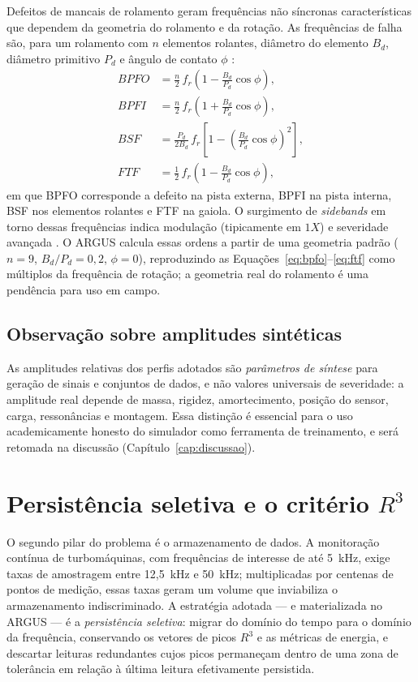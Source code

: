 Defeitos de mancais de rolamento geram frequências não síncronas características
que dependem da geometria do rolamento e da rotação. As frequências de falha
são, para um rolamento com \(n\) elementos rolantes, diâmetro do elemento
\(B_d\), diâmetro primitivo \(P_d\) e ângulo de contato \(\phi\)
\cite{randall2011,harris2002}:
\begin{align}
\label{eq:bpfo}
  BPFO &= \frac{n}{2}\, f_r \left(1 - \frac{B_d}{P_d}\cos\phi\right),\\[2pt]
\label{eq:bpfi}
  BPFI &= \frac{n}{2}\, f_r \left(1 + \frac{B_d}{P_d}\cos\phi\right),\\[2pt]
\label{eq:bsf}
  BSF  &= \frac{P_d}{2 B_d}\, f_r \left[1 - \left(\frac{B_d}{P_d}\cos\phi\right)^2\right],\\[2pt]
\label{eq:ftf}
  FTF  &= \frac{1}{2}\, f_r \left(1 - \frac{B_d}{P_d}\cos\phi\right),
\end{align}
em que BPFO corresponde a defeito na pista externa, BPFI na pista interna, BSF
nos elementos rolantes e FTF na gaiola. O surgimento de \emph{sidebands} em
torno dessas frequências indica modulação (tipicamente em \(1X\)) e severidade
avançada \cite{randall2011}. O ARGUS calcula essas ordens a partir de uma
geometria padrão (\(n=9\), \(B_d/P_d=0{,}2\), \(\phi=0\)), reproduzindo as
Equações~\eqref{eq:bpfo}--\eqref{eq:ftf} como múltiplos da frequência de
rotação; a geometria real do rolamento é uma pendência para uso em campo.

\subsection{Observação sobre amplitudes sintéticas}

As amplitudes relativas dos perfis adotados são \emph{parâmetros de síntese}
para geração de sinais e conjuntos de dados, e não valores universais de
severidade: a amplitude real depende de massa, rigidez, amortecimento,
posição do sensor, carga, ressonâncias e montagem. Essa distinção é essencial
para o uso academicamente honesto do simulador como ferramenta de treinamento,
e será retomada na discussão (Capítulo~\ref{cap:discussao}).

\section{Persistência seletiva e o critério \(R^3\)}

O segundo pilar do problema é o armazenamento de dados. A monitoração contínua
de turbomáquinas, com frequências de interesse de até 5~kHz, exige taxas de
amostragem entre 12,5~kHz e 50~kHz; multiplicadas por centenas de pontos de
medição, essas taxas geram um volume que inviabiliza o armazenamento
indiscriminado. A estratégia adotada --- e materializada no ARGUS --- é a
\emph{persistência seletiva}: migrar do domínio do tempo para o domínio da
frequência, conservando os vetores de picos \(R^3\) e as métricas de energia, e
descartar leituras redundantes cujos picos permaneçam dentro de uma zona de
tolerância em relação à última leitura efetivamente persistida.

